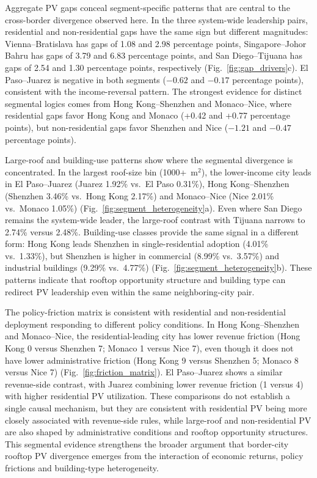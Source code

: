\documentclass[pdflatex,sn-nature]{sn-jnl}
\begin{document}
Aggregate PV gaps conceal segment-specific patterns that are central to the cross-border divergence observed here. In the three system-wide leadership pairs, residential and non-residential gaps have the same sign but different magnitudes: Vienna--Bratislava has gaps of 1.08 and 2.98 percentage points, Singapore--Johor Bahru has gaps of 3.79 and 6.83 percentage points, and San Diego--Tijuana has gaps of 2.54 and 1.30 percentage points, respectively (Fig.~\ref{fig:gap_drivers}c). El Paso--Juarez is negative in both segments ($-0.62$ and $-0.17$ percentage points), consistent with the income-reversal pattern. The strongest evidence for distinct segmental logics comes from Hong Kong--Shenzhen and Monaco--Nice, where residential gaps favor Hong Kong and Monaco (+0.42 and +0.77 percentage points), but non-residential gaps favor Shenzhen and Nice ($-1.21$ and $-0.47$ percentage points).

Large-roof and building-use patterns show where the segmental divergence is concentrated. In the largest roof-size bin (1000+~m$^{2}$), the lower-income city leads in El Paso--Juarez (Juarez 1.92\% vs.\ El Paso 0.31\%), Hong Kong--Shenzhen (Shenzhen 3.46\% vs.\ Hong Kong 2.17\%) and Monaco--Nice (Nice 2.01\% vs.\ Monaco 1.05\%) (Fig.~\ref{fig:segment_heterogeneity}a). Even where San Diego remains the system-wide leader, the large-roof contrast with Tijuana narrows to 2.74\% versus 2.48\%. Building-use classes provide the same signal in a different form: Hong Kong leads Shenzhen in single-residential adoption (4.01\% vs.\ 1.33\%), but Shenzhen is higher in commercial (8.99\% vs.\ 3.57\%) and industrial buildings (9.29\% vs.\ 4.77\%) (Fig.~\ref{fig:segment_heterogeneity}b). These patterns indicate that rooftop opportunity structure and building type can redirect PV leadership even within the same neighboring-city pair.

The policy-friction matrix is consistent with residential and non-residential deployment responding to different policy conditions. In Hong Kong--Shenzhen and Monaco--Nice, the residential-leading city has lower revenue friction (Hong Kong 0 versus Shenzhen 7; Monaco 1 versus Nice 7), even though it does not have lower administrative friction (Hong Kong 9 versus Shenzhen 5; Monaco 8 versus Nice 7) (Fig.~\ref{fig:friction_matrix}). El Paso--Juarez shows a similar revenue-side contrast, with Juarez combining lower revenue friction (1 versus 4) with higher residential PV utilization. These comparisons do not establish a single causal mechanism, but they are consistent with residential PV being more closely associated with revenue-side rules, while large-roof and non-residential PV are also shaped by administrative conditions and rooftop opportunity structures. This segmental evidence strengthens the broader argument that border-city rooftop PV divergence emerges from the interaction of economic returns, policy frictions and building-type heterogeneity.
\end{document}
